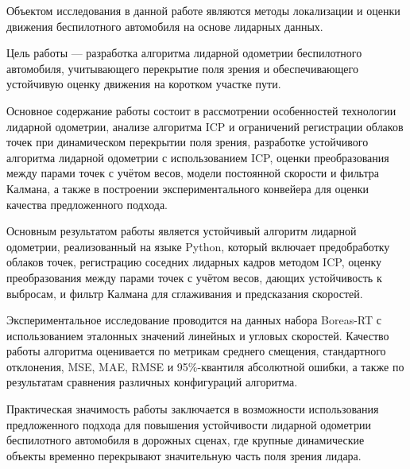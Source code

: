 \abstract %


Объектом исследования в данной работе являются методы локализации и оценки движения беспилотного автомобиля на основе лидарных данных.

Цель работы --- разработка алгоритма лидарной одометрии беспилотного автомобиля, учитывающего перекрытие поля зрения и обеспечивающего устойчивую оценку движения на коротком участке пути.

Основное содержание работы состоит в рассмотрении особенностей технологии лидарной одометрии, анализе алгоритма ICP и ограничений регистрации облаков точек при динамическом перекрытии поля зрения, разработке устойчивого алгоритма лидарной одометрии с использованием ICP, оценки преобразования между парами точек с учётом весов, модели постоянной скорости и фильтра Калмана, а также в построении экспериментального конвейера для оценки качества предложенного подхода.

Основным результатом работы является устойчивый алгоритм лидарной одометрии, реализованный на языке Python, который включает предобработку облаков точек, регистрацию соседних лидарных кадров методом ICP, оценку преобразования между парами точек с учётом весов, дающих устойчивость к выбросам, и фильтр Калмана для сглаживания и предсказания скоростей.

Экспериментальное исследование проводится на данных набора Boreas-RT с использованием эталонных значений линейных и угловых скоростей. Качество работы алгоритма оценивается по метрикам среднего смещения, стандартного отклонения, MSE, MAE, RMSE и 95\%-квантиля абсолютной ошибки, а также по результатам сравнения различных конфигураций алгоритма.

Практическая значимость работы заключается в возможности использования предложенного подхода для повышения устойчивости лидарной одометрии беспилотного автомобиля в дорожных сценах, где крупные динамические объекты временно перекрывают значительную часть поля зрения лидара.